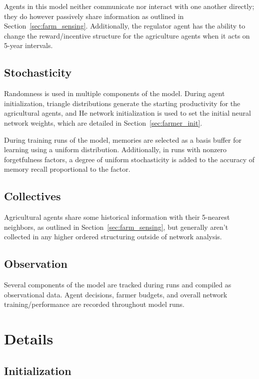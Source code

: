 Agents in this model neither communicate nor interact with one another
directly;
they do however passively share information as outlined 
in Section~\ref{sec:farm_sensing}.
Additionally, the regulator agent has the ability to change the
reward/incentive structure for the agriculture agents when it acts on
5-year intervals.

\subsection{Stochasticity}

Randomness is used in multiple components of the model. During agent initialization, triangle distributions generate the starting productivity for the agricultural agents, and He network initialization is used to set the initial neural network weights, which are detailed in Section~\ref{sec:farmer_init}.

During training runs of the model, memories are selected as a basis buffer for learning using a uniform distribution. Additionally, in runs with nonzero forgetfulness factors, a degree of uniform stochasticity is added to the accuracy of memory recall proportional to the factor.

\subsection{Collectives}

Agricultural agents share some historical information with their
5-nearest neighbors,
as outlined in Section~\ref{sec:farm_sensing},
but generally aren't collected in any higher ordered structuring
outside of network analysis.

\subsection{Observation}

Several components of the model are tracked during runs and compiled
as observational data.
Agent decisions, farmer budgets, and overall network training/performance
are recorded throughout model runs.

\section{Details}

\subsection{Initialization}

